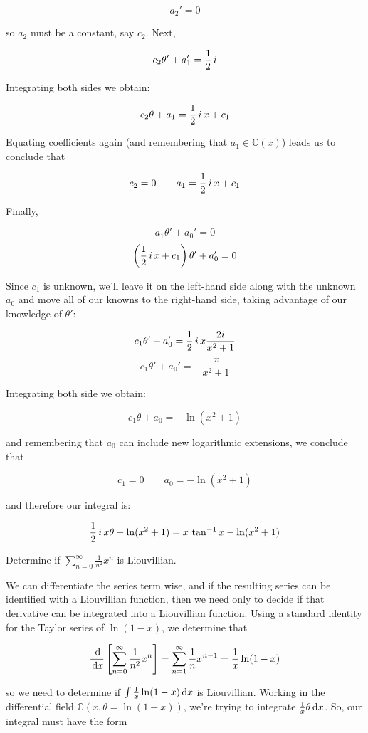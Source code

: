 $$a_2' = 0$$

so $a_2$ must be a constant, say $c_2$.  Next,

$$c_2\theta' + a_1' = {1\over2}\,i$$

Integrating both sides we obtain:

$$c_2\theta + a_1 = {1\over2}\,i\,x + c_1$$

Equating coefficients again (and remembering that
$a_1 \in {\mathbb C}(x)$) leads us to conclude that

$$c_2=0 \qquad a_1 = {1\over2}\,i\,x + c_1$$

Finally,

$$a_1\theta' + a_0' = 0$$
$$\left({1\over2}\,i\,x + c_1\right)\theta' + a_0' = 0$$

Since $c_1$ is unknown, we'll leave it on the left-hand side along
with the unknown $a_0$ and move all of our knowns to the right-hand
side, taking advantage of our knowledge of $\theta'$:

$$c_1\theta' + a_0' = {1\over2}\,i\,x \frac{2i}{x^2+1}$$
$$c_1\theta' + a_0' = - \frac{x}{x^2+1}$$

Integrating both side we obtain:

$$c_1\theta + a_0 = - \ln(x^2+1)$$

and remembering that $a_0$ can include new logarithmic extensions, we
conclude that

$$c_1 = 0 \qquad a_0 = - \ln(x^2+1)$$

and therefore our integral is:

$${1\over2}\,i\,x \theta - \ln(x^2+1) = x\,\tan^{-1} x - \ln(x^2+1)$$


\endexample

\example Determine if $\sum_{n=0}^\infty \frac{1}{n^2} x^n$ is Liouvillian.

We can differentiate the series term wise, and if the resulting series
can be identified with a Liouvillian function, then we need only to
decide if that derivative can be integrated into a Liouvillian
function.  Using a standard identity for the Taylor series of $\ln
(1-x)$, we determine that

$$\frac{\,\mathrm{d}}{\,\mathrm{d} x} \left[ \sum_{n=0}^\infty \frac{1}{n^2} x^n \right] = \sum_{n=1}^\infty \frac{1}{n} x^{n-1} = \frac{1}{x}\ln (1-x)$$

so we need to determine if $\int \frac{1}{x}\ln (1-x) \,\mathrm{d} x$ is Liouvillian.  Working in the
differential field ${\mathbb C}(x,\theta = \ln (1-x))$, we're trying to integrate
$\frac{1}{x}\theta \,\mathrm{d} x$.  So, our integral must have the form

